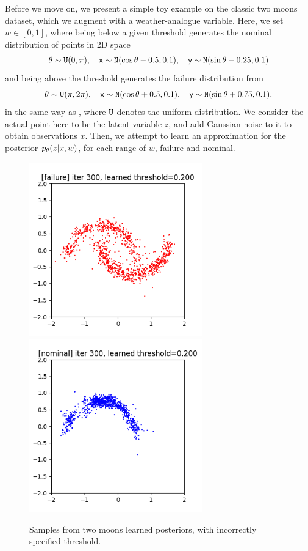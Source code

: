 Before we move on, we present a simple toy example on the classic two moons dataset, which we augment with a weather-analogue variable. Here, we set $w\in [0,1]$, where being below a given threshold generates the nominal distribution of points in 2D space
\[
    \theta \sim \mathtt{U}(0, \pi),\quad \mathsf x \sim\mathtt{N}(\cos\theta - 0.5, 0.1), \quad \mathsf y \sim \mathtt{N}(\sin \theta - 0.25, 0.1)
\]
and being above the threshold generates the failure distribution from
\[
    \theta \sim \mathtt{U}(\pi, 2\pi),\quad \mathsf x \sim\mathtt{N}(\cos\theta + 0.5, 0.1), \quad \mathsf y \sim \mathtt{N}(\sin \theta + 0.75, 0.1),
\]
in the same way as \cite{dawson2025rare}, where $\mathtt{U}$ denotes the uniform distribution. We consider the actual point here to be the latent variable $z$, and add Gaussian noise to it to obtain observations $x$. Then, we attempt to learn an approximation for the posterior $\pld{z\given x,w}$, for each range of $w$, failure and nominal.

\begin{figure}[htb!]
    \centering
    \includegraphics[height=7.5cm]{media/Figure_1A.300.png}
    \includegraphics[height=7.5cm]{media/Figure_2A.300.png}
    \caption{Samples from two moons learned posteriors, with incorrectly specified threshold.}
    \label{fig:2moons-bad}
\end{figure}

